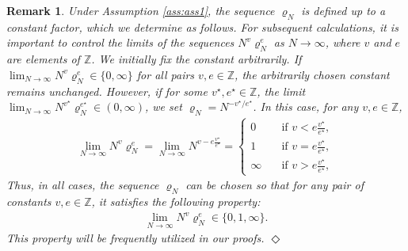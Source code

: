\documentclass[11pt,reqno]{amsart}
\numberwithin{equation}{section}
\newcommand{\Z}{\mathbb{Z}}
\newtheorem{remark}[theo]{Remark}
\newcommand{\COM}[1]{}
\newcommand{\CN}[1]{{\color{red}#1}}
\begin{document}
\begin{remark}{\em 
    {Under Assumption \ref{ass:ass1}, the sequence $\varrho_N$ is defined up to a constant factor, which we determine as follows. For subsequent calculations, it is important to control the limits of the sequences $N^v\varrho_N^e$ as $N\to\infty$, where $v$ and $e$ are elements of $\Z$. We initially fix the constant arbitrarily. If $\lim_{N\to\infty}N^v\varrho_N^e\in\{0,\infty\}$ for all pairs $v,e\in\Z$, the arbitrarily chosen constant remains unchanged. However, if for some $v^{\star},e^{\star}\in\Z$, the limit $\lim_{N\to\infty}N^{v^{\star}}\varrho_N^{e^{\star}}\in(0,\infty)$, we set $\varrho_N = N^{-v^{\star}/e^{\star}}$. In this case, for any $v,e\in\Z$,} \begin{align*}
        \lim_{N\to\infty}N^v\varrho_N^e = \lim_{N\to\infty}N^{v - e\frac{v^{\star}}{e^{\star}}} = \begin{cases} 0 \quad &\text{if } v < e\frac{v^{\star}}{e^{\star}}, \\
        1 \quad &\text{if } v = e\frac{v^{\star}}{e^{\star}}, \\
        \infty \quad &\text{if } v > e\frac{v^{\star}}{e^{\star}}, \end{cases} 
    \end{align*} 
    {Thus, in all cases, the sequence $\varrho_N$ can be chosen so that for any pair of constants $v,e\in\mathbb{Z}$, it satisfies the following property:} 
    \begin{align} 
        \lim_{N\to\infty}N^{v}\varrho_N^{e} \in\{0,1,\infty\}.\label{rho_choice}
    \end{align}
    {This property will be frequently utilized in our proofs.}
    \hfill ${\Diamond}$}
\end{remark}


\COM{
\begin{remark}\footnote{\CN{N: Here the upper bound $p_+$ is important, but however we do not need the lower bound $p_-$}}{\em 
    As the convergence in \eqref{p_asymptotics} is uniform and the limiting function $p_{\star}(t)$ is positive and continuous on $[0,T]$, we can find positive constants $p_-, p_+$ such that for large enough $N$ and all $t\in[0,T]$, the following lower and upper bound apply:
    \begin{align}
        0<p_-\leqslant \frac{p_N(t)}{\varrho_N}\leqslant p_+<\infty
    \end{align}} \hfill ${\Diamond}$
\end{remark}
}
\end{document}
